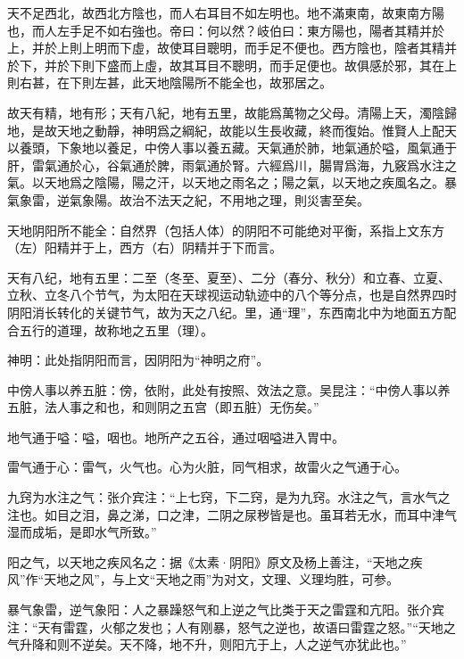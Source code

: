 \documentclass[12pt]{ctexbook}
\begin{document}

\begin{yuanwen}
天不足西北，故西北方陰也，而人右耳目不如左明也。地不滿東南，故東南方陽也，而人左手足不如右強也。帝曰：何以然？岐伯曰：東方陽也，陽者其精并於上，并於上則上明而下虛，故使耳目聰明，而手足不便也。西方陰也，陰者其精并於下，并於下則下盛而上虛，故其耳目不聰明，而手足便也。故俱感於邪，其在上則右甚，在下則左甚，此天地陰陽所不能全也，故邪居之。

故天有精，地有形；天有八紀，地有五里，故能爲萬物之父母。清陽上天，濁陰歸地，是故天地之動靜，神明爲之綱紀，故能以生長收藏，終而復始。惟賢人上配天以養頭，下象地以養足，中傍人事以養五藏。天氣通於肺，地氣通於嗌，風氣通于肝，雷氣通於心，谷氣通於脾，雨氣通於腎。六經爲川，腸胃爲海，九竅爲水注之氣。以天地爲之陰陽，陽之汗，以天地之雨名之；陽之氣，以天地之疾風名之。暴氣象雷，逆氣象陽。故治不法天之紀，不用地之理，則災害至矣。
\end{yuanwen}


\begin{jiaozhu}
	\item 天地阴阳所不能全：自然界（包括人体）的阴阳不可能绝对平衡，系指上文东方（左）阳精并于上，西方（右）阴精并于下而言。
	\item 天有八纪，地有五里：二至（冬至、夏至）、二分（春分、秋分）和立春、立夏、立秋、立冬八个节气，为太阳在天球视运动轨迹中的八个等分点，也是自然界四时阴阳消长转化的关键节气，故为天之八纪。里，通“理”，东西南北中为地面五方配合五行的道理，故称地之五里（理）。
	\item 神明：此处指阴阳而言，因阴阳为“神明之府”。
	\item 中傍人事以养五脏：傍，依附，此处有按照、效法之意。吴昆注：“中傍人事以养五脏，法人事之和也，和则阴之五宫（即五脏）无伤矣。”
	\item 地气通于嗌：嗌，咽也。地所产之五谷，通过咽嗌进入胃中。
	\item 雷气通于心：雷气，火气也。心为火脏，同气相求，故雷火之气通于心。
	\item 九窍为水注之气：张介宾注：“上七窍，下二窍，是为九窍。水注之气，言水气之注也。如目之泪，鼻之涕，口之津，二阴之尿秽皆是也。虽耳若无水，而耳中津气湿而成垢，是即水气所致。”
	\item 阳之气，以天地之疾风名之：据《太素·阴阳》原文及杨上善注，“天地之疾风”作“天地之风”，与上文“天地之雨”为对文，文理、义理均胜，可参。
	\item 暴气象雷，逆气象阳：人之暴躁怒气和上逆之气比类于天之雷霆和亢阳。张介宾注：“天有雷霆，火郁之发也；人有刚暴，怒气之逆也，故语曰雷霆之怒。”“天地之气升降和则不逆矣。天不降，地不升，则阳亢于上，人之逆气亦犹此也。”
\end{jiaozhu}
\end{document}
